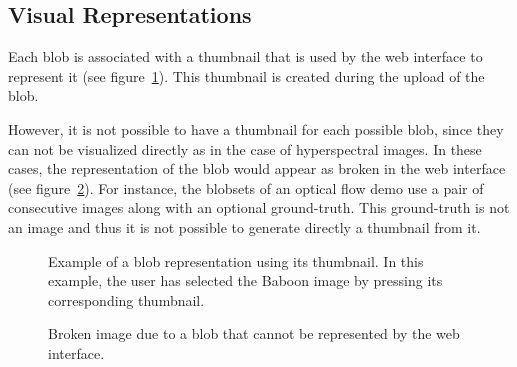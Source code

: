\subsection{Visual Representations}
Each blob is associated with a thumbnail that is used by the web interface to represent it (see figure~\ref{fig:blob_thumbnail_example}). This thumbnail is created during the upload of the blob.  

However, it is not possible to have a thumbnail for each possible blob, since they can not be visualized directly as in the case of hyperspectral images. In these cases, the representation of the blob would appear as broken in the web interface (see figure~\ref{fig:broken_representation}). For instance, the blobsets of an optical flow demo use a pair of consecutive images along with an optional ground-truth. This ground-truth is not an image and thus it is not possible to generate directly a thumbnail from it.
%

\begin{figure}[h]
\centering
{}
\caption{Example of a blob representation using its thumbnail. In this example, the user has selected the Baboon image by pressing its corresponding thumbnail.} 
\label{fig:blob_thumbnail_example}
\end{figure}
%
\begin{figure}[h]
\centering
{}
\caption{Broken image due to a blob that cannot be represented by the web interface.} 
\label{fig:broken_representation}
\end{figure}

